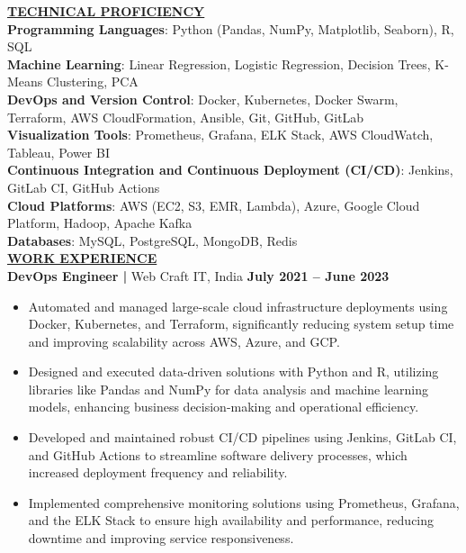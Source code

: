 \documentclass{article}
\begin{document}
\noindent \textbf{\underline{TECHNICAL PROFICIENCY}} \\
\textbf{Programming Languages}{: \small Python (Pandas, NumPy, Matplotlib, Seaborn), R, SQL} \\
\textbf{Machine Learning}{: \small Linear Regression, Logistic Regression, Decision Trees, K-Means Clustering, PCA} \\
\textbf{DevOps and Version Control}{: \small Docker, Kubernetes, Docker Swarm, Terraform, AWS CloudFormation, Ansible, Git, GitHub, GitLab} \\
\textbf{Visualization Tools}{: \small Prometheus, Grafana, ELK Stack, AWS CloudWatch, Tableau, Power BI} \\
\textbf{Continuous Integration and Continuous Deployment (CI/CD)}{: \small Jenkins, GitLab CI, GitHub Actions} \\
\textbf{Cloud Platforms}{: \small AWS (EC2, S3, EMR, Lambda), Azure, Google Cloud Platform, Hadoop, Apache Kafka} \\
\textbf{Databases}{: \small MySQL, PostgreSQL, MongoDB, Redis} \\

\noindent \textbf{\underline{WORK EXPERIENCE}} \\
\noindent \textbf{DevOps Engineer | } Web Craft IT, India  \hfill \textbf{July 2021 – June 2023}
\begin{itemize}[noitemsep,nolistsep,leftmargin=*]
\item {\small Automated and managed large-scale cloud infrastructure deployments using Docker, Kubernetes, and Terraform, significantly reducing system setup time and improving scalability across AWS, Azure, and GCP.}
\item {\small Designed and executed data-driven solutions with Python and R, utilizing libraries like Pandas and NumPy for data analysis and machine learning models, enhancing business decision-making and operational efficiency.}
\item {\small Developed and maintained robust CI/CD pipelines using Jenkins, GitLab CI, and GitHub Actions to streamline software delivery processes, which increased deployment frequency and reliability.}
\item {\small Implemented comprehensive monitoring solutions using Prometheus, Grafana, and the ELK Stack to ensure high availability and performance, reducing downtime and improving service responsiveness.}
\end{itemize}
\end{document}
